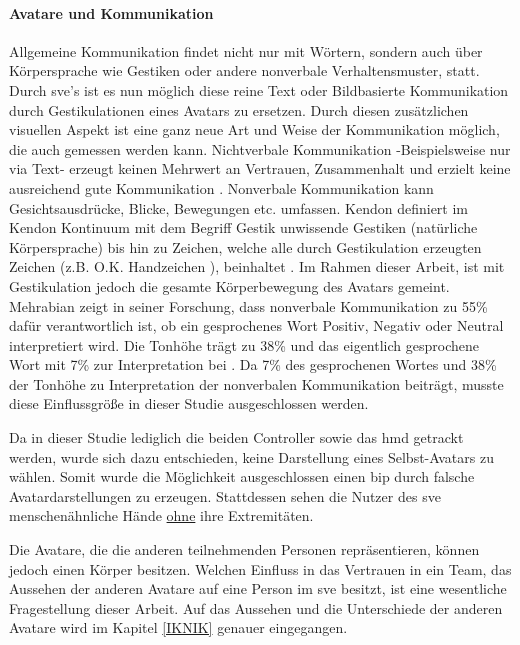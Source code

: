 \documentclass[a4paper,11pt]{article}%
\renewcommand{\\}{\vspace*{0.5\baselineskip} \newline}
\begin{document}
\paragraph{Avatare und Kommunikation}
Allgemeine Kommunikation findet nicht nur mit Wörtern, sondern auch über Körpersprache wie Gestiken oder andere nonverbale Verhaltensmuster, statt. Durch \ac{sve}'s ist es nun möglich diese reine Text oder Bildbasierte Kommunikation durch Gestikulationen eines Avatars zu ersetzen. Durch diesen zusätzlichen visuellen Aspekt ist eine ganz neue Art und Weise der Kommunikation möglich, die auch gemessen werden kann. 
Nichtverbale Kommunikation -Beispielsweise nur via Text- erzeugt keinen Mehrwert an Vertrauen, Zusammenhalt und erzielt keine ausreichend gute Kommunikation \citep[p.81]{haslam2003social}.
Nonverbale Kommunikation kann Gesichtsausdrücke, Blicke, Bewegungen etc. umfassen. Kendon definiert im \dq{}Kendon Kontinuum\dq{} mit dem Begriff \dq{}Gestik\dq{} unwissende Gestiken (natürliche Körpersprache) bis hin zu \dq{} Zeichen\flqq, welche alle durch Gestikulation erzeugten Zeichen (z.B. O.K. Handzeichen ), beinhaltet \citep[37]{mcneill1992hand}.
Im Rahmen dieser Arbeit, ist mit Gestikulation jedoch die gesamte Körperbewegung des Avatars gemeint.
Mehrabian zeigt in seiner Forschung, dass nonverbale Kommunikation zu 55\% dafür verantwortlich ist, ob ein gesprochenes Wort Positiv, Negativ oder Neutral interpretiert wird. Die Tonhöhe trägt zu 38\% und das eigentlich gesprochene Wort mit 7\% zur Interpretation bei \citep[43]{mehrabian1971silent}.
Da 7\% des gesprochenen Wortes und 38\% der Tonhöhe zu Interpretation der nonverbalen Kommunikation beiträgt, musste diese Einflussgröße in dieser Studie ausgeschlossen werden.

Da in dieser Studie lediglich die beiden Controller sowie das \ac{hmd} getrackt werden, wurde sich dazu entschieden, keine Darstellung eines Selbst-Avatars zu wählen. Somit wurde die Möglichkeit ausgeschlossen einen \ac{bip} durch falsche Avatardarstellungen zu erzeugen. Stattdessen sehen die Nutzer des \ac{sve} menschenähnliche Hände \underline{ohne} ihre Extremitäten.

Die Avatare, die die \dq{}anderen\dq{} teilnehmenden Personen repräsentieren, können jedoch einen Körper besitzen.
Welchen Einfluss in das Vertrauen in ein Team, das Aussehen der \dq{}anderen\dq{} Avatare auf eine Person im \ac{sve} besitzt, ist eine wesentliche Fragestellung dieser Arbeit. Auf das Aussehen und die Unterschiede der \dq{}anderen\dq{} Avatare wird im Kapitel \ref{IKNIK} genauer eingegangen.
\end{document}
